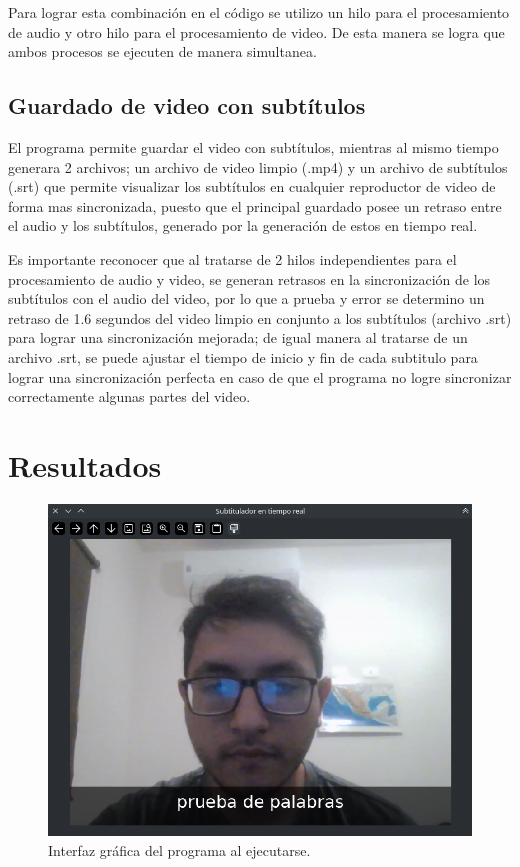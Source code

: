 \documentclass[conference]{IEEEtran}
\begin{document}
Para lograr esta combinación en el código se utilizo un hilo para el procesamiento de audio y otro hilo para el procesamiento de video. De esta manera se logra que ambos procesos se ejecuten de manera simultanea. 

\subsection{Guardado de video con subtítulos}
El programa permite guardar el video con subtítulos, mientras al mismo tiempo generara 2 archivos; un archivo de video limpio (.mp4) y un archivo de subtítulos (.srt) que permite visualizar los subtítulos en cualquier reproductor de video de forma mas sincronizada, puesto que el principal guardado posee un retraso entre el audio y los subtítulos, generado por la generación de estos en tiempo real.

Es importante reconocer que al tratarse de 2 hilos independientes para el procesamiento de audio y video, se generan retrasos en la sincronización de los subtítulos con el audio del video, por lo que a prueba y error se determino un retraso de 1.6 segundos del video limpio en conjunto a los subtítulos (archivo .srt) para lograr una sincronización mejorada; de igual manera al tratarse de un archivo .srt, se puede ajustar el tiempo de inicio y fin de cada subtitulo para lograr una sincronización perfecta en caso de que el programa no logre sincronizar correctamente algunas partes del video.


\section{Resultados}


\begin{figure}[ht]
    \centering
    \includegraphics[width=\columnwidth]{images/default-UI.png}
    \caption{Interfaz gráfica del programa al ejecutarse.}
    \label{fig:default-UI}
\end{figure}
\end{document}
